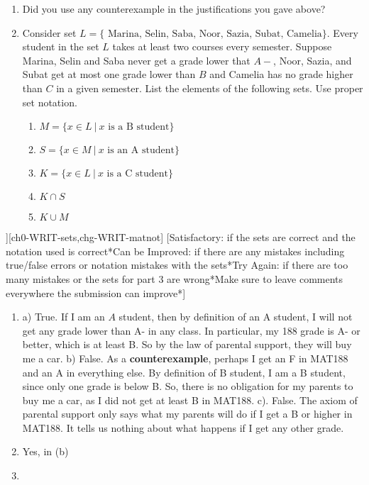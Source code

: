 \begin{SaveQuestion}
{\begin{enumerate}
		parents at the end of the semester. \\
		c) If I am a ``C'' student, I will not get a new car from my
		parents at the end of the semester.
        \item Did you use any counterexample in the justifications you gave above?
	\item Consider set $L=\{\text{ Marina, Selin,  Saba, Noor, Sazia, Subat, Camelia}\}$. Every student in the set $L$ takes at least two courses every semester. Suppose Marina, Selin and Saba never get a grade lower that $A-$, Noor, Sazia, and Subat get at most one grade lower than $B$ and Camelia has no grade higher than $C$ in a given semester. List the elements of the following sets. Use proper set notation.
	\begin{enumerate}
		\item $M=\{x\in L\:|\: x \text{ is a B student}\}$
		\item $S=\{x\in M\:|\: x \text{ is an A student}\}$
		\item $K=\{x\in L\:|\: x \text{ is a C student}\}$
		\item $K\cap S$
		\item $K\cup M$
	\end{enumerate}
\end{enumerate}
  }][ch0-WRIT-sets,chg-WRIT-matnot]
  [Satisfactory: if the sets are correct and the notation used is correct*Can be Improved: if there are any mistakes including true/false errors or notation mistakes with the sets*Try Again: if there are too many mistakes or the sets for part 3 are wrong*Make sure to leave comments everywhere the submission can improve*]
    \begin{enumerate}
    \item
    a) True. If I am an $A$ student, then by definition of an A student, I will not get any grade lower than A- in any class. In particular, my 188 grade is A- or better, which is at least B. So by the law of parental support, they will buy me a car.
    b) False. As a \textbf{counterexample}, perhaps I get an F in MAT188 and an A in everything else. By definition of B student, I am a B student, since only one grade is below B. So, there is no obligation for my parents to buy me a car, as I did not get at least B in MAT188. 
    c). False. The axiom of parental support only says what my parents will do if I get a B or higher in MAT188. It tells us nothing about what happens if I get any other grade.
    \item Yes, in (b)
    \item

\end{enumerate}
\end{SaveQuestion}
